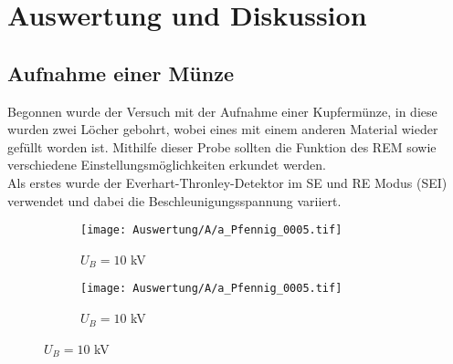 
\chapter{Auswertung und Diskussion}
\label{chap:versuchsauswertung}

\section{Aufnahme einer Münze}
Begonnen wurde der Versuch mit der Aufnahme einer Kupfermünze, in diese wurden zwei Löcher gebohrt, wobei eines mit einem anderen Material wieder gefüllt worden ist. Mithilfe dieser Probe sollten die Funktion des REM sowie verschiedene Einstellungsmöglichkeiten erkundet werden.\\

Als erstes wurde der Everhart-Thronley-Detektor im SE und RE Modus (SEI) verwendet und dabei die Beschleunigungsspannung variiert.
\begin{figure}[h]
    \centering
    
    \begin{subfigure}[b]{0.25\textwidth}
        \centering
        \texttt{[image: Auswertung/A/a\_Pfennig\_0005.tif]}
        \caption{$U_B = 10$ kV}
    \end{subfigure}
    \hfill
    \begin{subfigure}[b]{0.25\textwidth}
        \centering
        \texttt{[image: Auswertung/A/a\_Pfennig\_0005.tif]}
        \caption{$U_B = 10$ kV}
    \end{subfigure}
\end{figure}